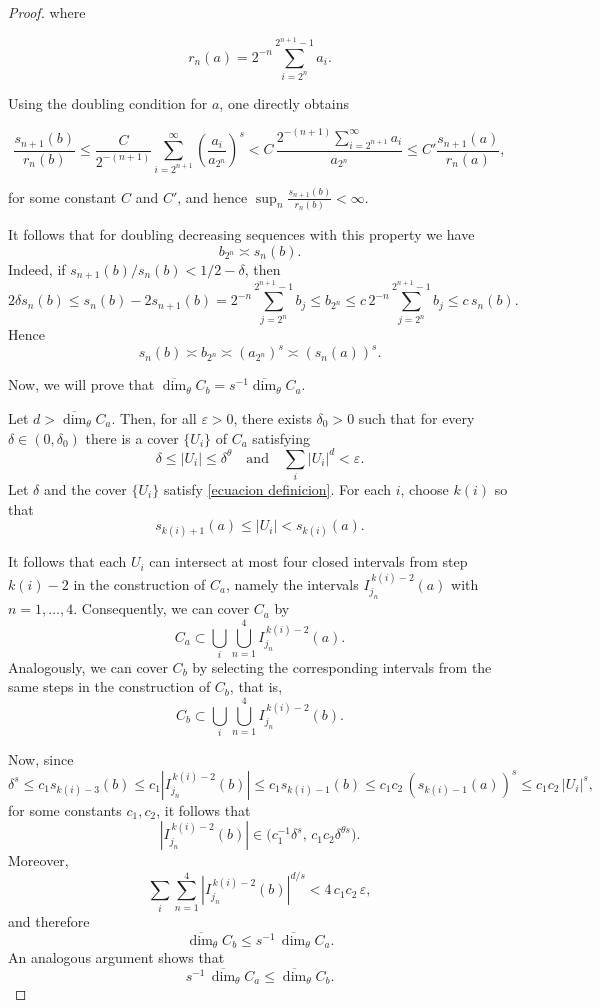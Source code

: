 \documentclass[10pt,a4paper]{amsart}
\renewcommand{\epsilon}{\varepsilon}
\begin{document}
\begin{proof}
where

$$
r_n(a) = 2^{-n}\sum_{i=2^n}^{2^{n+1}-1} a_i.
$$

Using the doubling condition for $a$, one directly obtains

$$
\frac{s_{n+1}(b)}{r_n(b)}\leq \frac{C}{2^{-(n+1)}} \sum_{i=2^{n+1}}^{\infty}\left(\frac{a_i}{a_{2^n}}\right)^s
< C\, \frac{2^{-(n+1)}\sum_{i=2^{n+1}}^{\infty}a_i}{a_{2^n}}
\leq C'\frac{s_{n+1}(a)}{r_n(a)},
$$

for some constant $C$ and $C'$, and hence $\sup_n \tfrac{s_{n+1}(b)}{r_n(b)} < \infty$.


It follows that for doubling decreasing sequences with this property we have\[b_{2^n}\asymp s_n(b).\]Indeed, if \(s_{n+1}(b)/s_n(b)<1/2-\delta\), then\[2\delta s_n(b) \leq s_n(b)-2s_{n+1}(b)=2^{-n}\sum_{j=2^n}^{2^{n+1}-1}b_j\leq b_{2^{n}}\leq c\, 2^{-n} \sum_{j=2^n}^{2^{n+1}-1}b_j \leq c\,s_n(b).\]Hence\[s_n(b)\asymp b_{2^n}\asymp (a_{2^n})^s\asymp (s_n(a))^s.\]


Now, we will prove that $\overline{\dim}_\theta C_b=s^{-1}\overline{\dim}_\theta C_a.$

Let $d > \overline{\dim}_\theta C_a$. Then, for all $\epsilon > 0$, there exists $\delta_0 > 0$ such that for every $\delta \in (0,\delta_0)$ there is a cover $\{U_i\}$ of $C_a$ satisfying
\begin{equation}\label{ecuacion definicion}
\delta \leq |U_i| \leq \delta^\theta
\quad \text{and} \quad
\sum_i |U_i|^d < \epsilon.
\end{equation}
Let $\delta$ and the cover $\{U_i\}$ satisfy \eqref{ecuacion definicion}. For each $i$, choose $k(i)$ so that
\[
s_{k(i)+1}(a) \leq |U_i| < s_{k(i)}(a).
\]

It follows that each $U_i$ can intersect at most four closed intervals from step $k(i)-2$ in the construction of $C_a$, namely the intervals $I_{j_n}^{\,k(i)-2}(a)$ with $n=1,\dots,4$. Consequently, we can cover $C_a$ by
\[
C_a \subset \bigcup_i \bigcup_{n=1}^4 I_{j_n}^{\,k(i)-2}(a).
\]
Analogously, we can cover $C_b$ by selecting the corresponding intervals from the same steps in the construction of $C_b$, that is,
\[
C_b \subset \bigcup_i \bigcup_{n=1}^4 I_{j_n}^{\,k(i)-2}(b).
\]



Now, since
\[
\delta^s \leq c_1 s_{k(i)-3}(b) \leq c_1 |I_{j_n}^{\,k(i)-2}(b)| \leq c_1 s_{k(i)-1}(b) 
\leq c_1 c_2 \,(s_{k(i)-1}(a))^s \leq c_1 c_2\, |U_i|^s,
\]
for some constants $c_1, c_2$, it follows that
\[
|I_{j_n}^{\,k(i)-2}(b)| \in \bigl(c_1^{-1}\delta^s,\, c_1 c_2 \delta^{\theta s}\bigr).
\]
Moreover,
\[
\sum_i \sum_{n=1}^4 |I_{j_n}^{\,k(i)-2}(b)|^{d/s} < 4\, c_1 c_2 \,\epsilon,
\]
and therefore
\[
\overline{\dim}_\theta C_b \leq s^{-1}\,\overline{\dim}_\theta C_a.
\]
An analogous argument shows that
\[
s^{-1}\,\overline{\dim}_\theta C_a \leq \overline{\dim}_\theta C_b.
\]








\end{proof}
\end{document}
